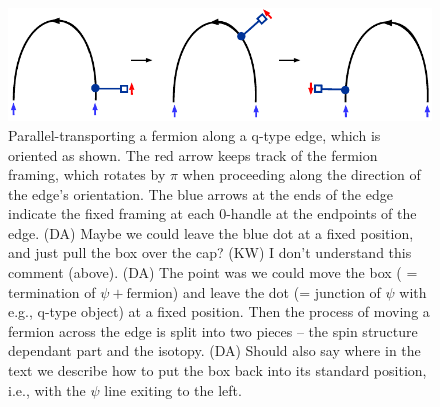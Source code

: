 \documentclass[12pt,a4paper]{article}
\newcounter{arrow}
\newcommand{\dave}[1]{{\color{ao(english)}\footnotesize{(DA) #1}}}
\newcommand{\kw}[1]{{\color{kwcolor}\footnotesize{(KW) #1}}}
\begin{document}
\begin{figure}
\begin{center}
\includegraphics{framing_rotation.pdf}
\end{center}
\caption{\label{framing_rot} Parallel-transporting a fermion along a q-type edge, which is oriented as shown. 
The red arrow keeps track of the fermion framing, which rotates by $\pi$ when proceeding along the direction of the edge's orientation.
The blue arrows at the ends of the edge indicate the fixed framing at each 0-handle at the endpoints of the edge. 
\dave{Maybe we could leave the blue dot at a fixed position, and just pull the box over the cap?
\kw{I don't understand this comment (above).}}
\dave{The point was we could move the box ( = termination of $\psi + \text{fermion}$) and leave the dot (= junction of $\psi$ with e.g., q-type object) at a fixed position.
Then the process of moving a fermion across the edge is split into two pieces -- the spin structure dependant part and the isotopy.
}
\dave{Should also say where in the text we describe how to put the box back into its standard position, 
i.e., with the $\psi$ line exiting to the left.}
}
  \label{framing_rotation}
\end{figure}
\end{document}
